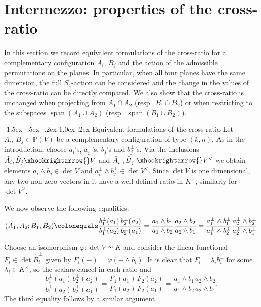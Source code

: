\documentclass[11pt,a4paper]{amsart}
\makeatletter
\renewcommand\subsection{\@startsection{subsection}{2}{\z@}
                                   {-1.5ex \@plus -.5ex \@minus -.2ex}%
                                   {1.0ex \@plus.2ex}%
                                   {\normalfont\itshape}}%
\newcommand{\pv}{\mathbb{P}(V)}
\renewcommand{\span}{\operatorname{span}}
\theoremstyle{plain}
\theoremstyle{definition}
\theoremstyle{remark}
\newcommand{\coleq}{\colonequals}
\makeatother
\begin{document}
\section{Intermezzo: properties of the cross-ratio}\label{sec:intermezzo}

In this section we record equivalent formulations of the cross-ratio for a complementary configuration $A_i,\,B_j$ and the action of the admissible permutations on the planes. In particular, when all four planes have the same dimension, the full $S_4$-action can be considered and the change in the values of the cross-ratio can be directly compared. We also show that the cross-ratio is unchanged when projecting from $A_1 \cap A_2$ (resp.\ $B_1\cap B_2$) or when restricting to the subspaces $\span(A_1 \cup A_2)$ (resp.\ $\span(B_1 \cup B_2)$). 

\subsection{Equivalent formulations of the cross-ratio}
Let $A_i,\,B_j \subset \pv$ be a complementary configuration of type $(k,n)$. As in the introduction, choose $a_i$'s, $a_i^\perp$'s, $b_j$'s and $b_j^\perp$'s.
 Via the inclusions $\hat{A}_i, \hat{B}_j\xhookrightarrow{} V$ and $\hat{A}_i^\perp, \hat{B}_j^\perp\xhookrightarrow{} V^\vee$ we obtain elements $a_i\wedge b_j\in \det V$ and $a_i^\perp\wedge b_j^\perp\in \det V^\vee$.
 Since $\det V$ is one dimensional, any two non-zero vectors in it have a well defined ratio in $K^\times$, similarly for $\det V^\vee$.
 
 We now observe the following equalities:
    \[
    (A_1,A_2;B_1,B_2) \coleq \frac{b_1^\perp(a_1)}{b_1^\perp(a_2)}\frac{b_2^\perp(a_2)}{b_2^\perp(a_1)}= \frac{a_1\wedge b_1}{a_1\wedge b_2}\frac{a_2\wedge b_2}{a_2\wedge b_1} = \frac{a^\perp_1\wedge b^\perp_1}{a^\perp_1\wedge b^\perp_2}\frac{a^\perp_2\wedge b^\perp_2}{a^\perp_2\wedge b^\perp_1}
    \]

    Choose an isomorphism $\varphi \colon \det V \simeq K$ and consider the linear functional $F_i \in \det \hat{B}_i^\perp$ given by $F_i(-) = \varphi\left(-\wedge b_i\right)$. It is clear that $F_i =\lambda_i b_i^\perp$ for some $\lambda_i \in K^\times$, so the scalars cancel in each ratio and
    $$
    \frac{b_1^\perp(a_1)}{b_1^\perp(a_2)}\frac{b_2^\perp(a_2)}{b_2^\perp(a_1)} = \frac{F_1(a_1)}{F_1(a_2)}\frac{F_2(a_2)}{F_2(a_1)} = \frac{a_1\wedge b_1}{a_1\wedge b_2}\frac{a_2\wedge b_2}{a_2\wedge b_1}.
    $$
    The third equality follows by a similar argument. 
\end{document}
